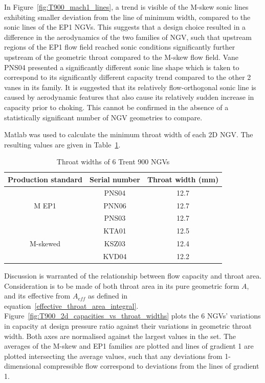\documentclass[a4paper, 11pt, oneside]{report}
\begin{document}
In Figure~\ref{fig:T900_mach1_lines}, a trend is visible of the M-skew sonic lines exhibiting smaller deviation from the line of minimum width, compared to the sonic lines of the EP1 NGVs. This suggests that a design choice resulted in a difference in the aerodynamics of the two families of NGV, such that upstream regions of the EP1 flow field reached sonic conditions significantly further upstream of the geometric throat compared to the M-skew flow field. Vane PNS04 presented a significantly different sonic line shape which is taken to correspond to its significantly different capacity trend compared to the other 2 vanes in its family. It is suggested that its relatively flow-orthogonal sonic line is caused by aerodynamic features that also cause its relatively sudden increase in capacity prior to choking. This cannot be confirmed in the absence of a statistically significant number of NGV geometries to compare.

Matlab was used to calculate the minimum throat width of each 2D NGV. The resulting values are given in Table~\ref{T900_throat_widths}.

\begin{table}[H]
\caption{Throat widths of 6 Trent 900 NGVs}
\label{T900_throat_widths}
\begin{center}
\begin{tabular}{|c|c|c|}
\hline
Production standard & Serial number & Throat width (mm)\\
\hline
\multirow{3}{*}{M EP1} & PNS04 & 12.7\\
 & PNN06 & 12.7\\
 & PNS03 & 12.7\\
\hline
\multirow{3}{*}{M-skewed} & KTA01 & 12.5\\
 & KSZ03 & 12.4\\
 & KVD04 & 12.2\\
\hline
\end{tabular}
\end{center}
\end{table}

Discussion is warranted of the relationship between flow capacity and throat area. Consideration is to be made of both throat area in its pure geometric form $A$, and its effective from $A_{eff}$ as defined in equation~\ref{effective_throat_area_integral}. Figure~\ref{fig:T900_2d_capacities_vs_throat_widths} plots the 6 NGVs' variations in capacity at design pressure ratio against their variations in geometric throat width. Both axes are normalised against the largest values in the set. The averages of the M-skew and EP1 families are plotted and lines of gradient 1 are plotted intersecting the average values, such that any deviations from 1-dimensional compressible flow correspond to deviations from the lines of gradient 1.
\end{document}

